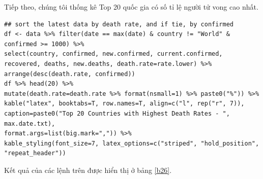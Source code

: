 \documentclass[12pt, a4paper,oneside]{book}
\theoremstyle{definition}
\begin{document}
Tiếp theo, chúng tôi thống kê Top 20 quốc gia có số tỉ lệ người tử vong cao nhất.
\begin{lstlisting}
## sort the latest data by death rate, and if tie, by confirmed
df <- data %>% filter(date == max(date) & country != "World" & confirmed >= 1000) %>%
select(country, confirmed, new.confirmed, current.confirmed,
recovered, deaths, new.deaths, death.rate=rate.lower) %>%
arrange(desc(death.rate, confirmed))
df %>% head(20) %>%
mutate(death.rate=death.rate %>% format(nsmall=1) %>% paste0("%")) %>%
kable("latex", booktabs=T, row.names=T, align=c("l", rep("r", 7)),
caption=paste0("Top 20 Countries with Highest Death Rates - ", max.date.txt),
format.args=list(big.mark=",")) %>%
kable_styling(font_size=7, latex_options=c("striped", "hold_position", "repeat_header"))
\end{lstlisting}
Kết quả của các lệnh trên được hiển thị ở bảng \ref{b26}.
\end{document}

